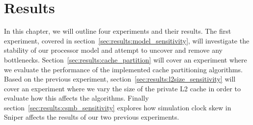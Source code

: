 
\chapter{Results}
\label{cpt:results}

In this chapter, we will outline four experiments and their results.
The first experiment, covered in section~\ref{sec:results:model_sensitivity}, will investigate the stability of our processor model and attempt to uncover and remove any bottlenecks.
Section~\ref{sec:results:cache_partition} will cover an experiment where we evaluate the performance of the implemented cache partitioning algorithms.
Based on the previous experiment, section~\ref{sec:results:l2size_sensitivity} will cover an experiment where we vary the size of the private L2 cache in order to evaluate how this affects the algorithms.
Finally section~\ref{sec:results:csmb_sensitivity} explores how simulation clock skew in Sniper affects the results of our two previous experiments.









